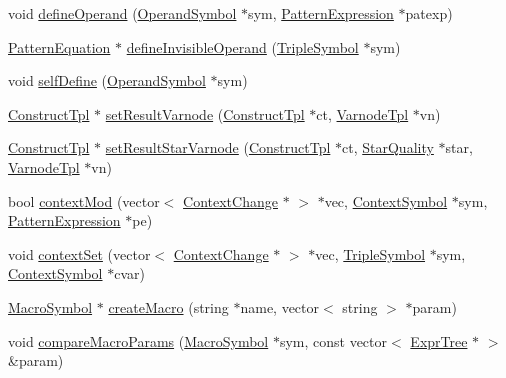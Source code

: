 \begin{DoxyCompactItemize}
\item 
void \mbox{\hyperlink{class_sleigh_compile_a13ca459265a60fa719375491070a378c}{define\+Operand}} (\mbox{\hyperlink{class_operand_symbol}{Operand\+Symbol}} $\ast$sym, \mbox{\hyperlink{class_pattern_expression}{Pattern\+Expression}} $\ast$patexp)
\item 
\mbox{\hyperlink{class_pattern_equation}{Pattern\+Equation}} $\ast$ \mbox{\hyperlink{class_sleigh_compile_ab9d0f1be08e773533a23ef417399ac87}{define\+Invisible\+Operand}} (\mbox{\hyperlink{class_triple_symbol}{Triple\+Symbol}} $\ast$sym)
\item 
void \mbox{\hyperlink{class_sleigh_compile_a506e372776432e6ba9d06ccf0402bfa9}{self\+Define}} (\mbox{\hyperlink{class_operand_symbol}{Operand\+Symbol}} $\ast$sym)
\item 
\mbox{\hyperlink{class_construct_tpl}{Construct\+Tpl}} $\ast$ \mbox{\hyperlink{class_sleigh_compile_a4faccf9bdca5d00e52a51ad46ce6de91}{set\+Result\+Varnode}} (\mbox{\hyperlink{class_construct_tpl}{Construct\+Tpl}} $\ast$ct, \mbox{\hyperlink{class_varnode_tpl}{Varnode\+Tpl}} $\ast$vn)
\item 
\mbox{\hyperlink{class_construct_tpl}{Construct\+Tpl}} $\ast$ \mbox{\hyperlink{class_sleigh_compile_a5d9ed43987bc167ad93691052361975d}{set\+Result\+Star\+Varnode}} (\mbox{\hyperlink{class_construct_tpl}{Construct\+Tpl}} $\ast$ct, \mbox{\hyperlink{struct_star_quality}{Star\+Quality}} $\ast$star, \mbox{\hyperlink{class_varnode_tpl}{Varnode\+Tpl}} $\ast$vn)
\item 
bool \mbox{\hyperlink{class_sleigh_compile_a84c46e7d0a62a9fbdb300e9b2df3f303}{context\+Mod}} (vector$<$ \mbox{\hyperlink{class_context_change}{Context\+Change}} $\ast$ $>$ $\ast$vec, \mbox{\hyperlink{class_context_symbol}{Context\+Symbol}} $\ast$sym, \mbox{\hyperlink{class_pattern_expression}{Pattern\+Expression}} $\ast$pe)
\item 
void \mbox{\hyperlink{class_sleigh_compile_ac7162d3b41a8315268b9a0d44d82d049}{context\+Set}} (vector$<$ \mbox{\hyperlink{class_context_change}{Context\+Change}} $\ast$ $>$ $\ast$vec, \mbox{\hyperlink{class_triple_symbol}{Triple\+Symbol}} $\ast$sym, \mbox{\hyperlink{class_context_symbol}{Context\+Symbol}} $\ast$cvar)
\item 
\mbox{\hyperlink{class_macro_symbol}{Macro\+Symbol}} $\ast$ \mbox{\hyperlink{class_sleigh_compile_a1ccff5875e71c234e97714f364a66ebf}{create\+Macro}} (string $\ast$name, vector$<$ string $>$ $\ast$param)
\item 
void \mbox{\hyperlink{class_sleigh_compile_adce2cad9a79bab4e9d03357e96668774}{compare\+Macro\+Params}} (\mbox{\hyperlink{class_macro_symbol}{Macro\+Symbol}} $\ast$sym, const vector$<$ \mbox{\hyperlink{class_expr_tree}{Expr\+Tree}} $\ast$ $>$ \&param)

\end{DoxyCompactItemize}
